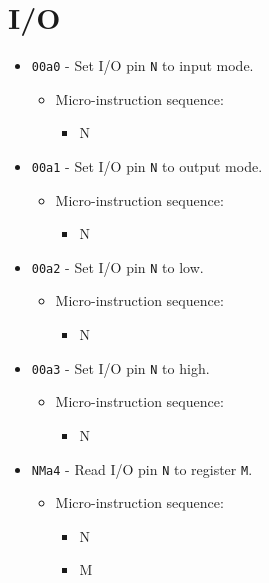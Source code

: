 \documentclass{article}
\begin{document}
\section{I/O}
\begin{itemize}
   \item \Verb|00a0| - Set I/O pin \Verb|N| to input mode.
   \begin{itemize}
        \item Micro-instruction sequence:
        \begin{itemize}
            \item \pinmodein N
        \end{itemize}
    \end{itemize}
    
    
   \item \Verb|00a1| - Set I/O pin \Verb|N| to output mode.
   \begin{itemize}
        \item Micro-instruction sequence:
        \begin{itemize}
            \item \pinmodeout N
        \end{itemize}
    \end{itemize}
    
   \item \Verb|00a2| - Set I/O pin \Verb|N| to low.
   \begin{itemize}
        \item Micro-instruction sequence:
        \begin{itemize}
            \item \setpinlow N
        \end{itemize}
    \end{itemize}
    
    
   \item \Verb|00a3| - Set I/O pin \Verb|N| to high.
   \begin{itemize}
        \item Micro-instruction sequence:
        \begin{itemize}
            \item \setpinhigh N
        \end{itemize}
    \end{itemize}
    
   \item \Verb|NMa4| - Read I/O pin \Verb|N| to register \Verb|M|.
   \begin{itemize}
        \item Micro-instruction sequence:
        \begin{itemize}
            \item \pintodata N
            \item \datatoreg M
        \end{itemize}
    \end{itemize}
    

\end{itemize}
\end{document}
